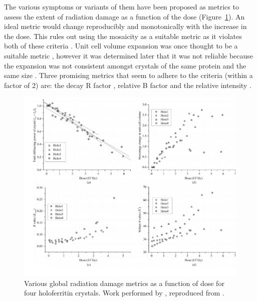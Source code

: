         The various symptoms or variants of them have been proposed as metrics to assess the extent of radiation damage as a function of the dose (Figure~\ref{fig:Radiation damage metrics}).
        An ideal metric would change reproducibly and monotonically with the increase in the dose.
        This rules out using the mosaicity as a suitable metric as it violates both of these criteria \cite{garman2010}.
        Unit cell volume expansion was once thought to be a suitable metric \cite{ravelli2002}, however it was determined later that it was not reliable because the expansion was not consistent amongst crystals of the same protein and the same size \cite{murray2002}.
        Three promising metrics that seem to adhere to the criteria (within a factor of 2) are: the decay R factor \cite{diederichs2006}, relative B factor \cite{kmetko2006} and the relative intensity \cite{owen2006}.

        \begin{figure}
            \centering
            \includegraphics[width=1.0\textwidth]{figures/introduction/raddammetrics.png}
            \caption{Various global radiation damage metrics as a function of dose for four holoferritin crystals. Work performed by \cite{owen2006}, reproduced from \cite{garman2010}.}
            \label{fig:Radiation damage metrics}
        \end{figure}

